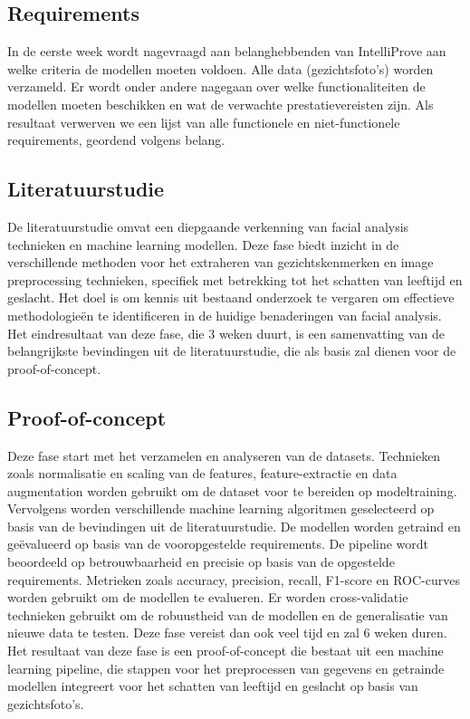 \subsection{Requirements}
\label{sub:requirements}
In de eerste week wordt nagevraagd aan belanghebbenden van IntelliProve aan welke criteria de modellen moeten voldoen. Alle data (gezichtsfoto's) worden verzameld. Er wordt onder andere nagegaan over welke functionaliteiten de modellen moeten beschikken en wat de verwachte prestatievereisten zijn. 
Als resultaat verwerven we een lijst van alle functionele en niet-functionele requirements, geordend volgens belang. 

\subsection{Literatuurstudie}
\label{sub:literatuurstudie}
De literatuurstudie omvat een diepgaande verkenning van facial analysis technieken en machine learning modellen. 
Deze fase biedt inzicht in de verschillende methoden voor het extraheren van gezichtskenmerken en image preprocessing technieken, specifiek met betrekking tot het schatten van leeftijd en geslacht.
Het doel is om kennis uit bestaand onderzoek te vergaren om effectieve methodologieën te identificeren in de huidige benaderingen van facial analysis. 
Het eindresultaat van deze fase, die 3 weken duurt, is een samenvatting van de belangrijkste bevindingen uit de literatuurstudie, die als basis zal dienen voor de proof-of-concept.
\subsection{Proof-of-concept}
\label{sub:proof-of-concept}
Deze fase start met het verzamelen en analyseren van de datasets. Technieken zoals normalisatie en scaling van de features, feature-extractie en data augmentation worden gebruikt om de dataset voor te bereiden op modeltraining.
Vervolgens worden verschillende machine learning algoritmen geselecteerd op basis van de bevindingen uit de literatuurstudie. De modellen worden getraind en geëvalueerd op basis van de vooropgestelde requirements. 
De pipeline wordt beoordeeld op betrouwbaarheid en precisie op basis van de opgestelde requirements. Metrieken zoals accuracy, precision, recall, F1-score en ROC-curves worden gebruikt om de modellen te evalueren.
Er worden cross-validatie technieken gebruikt om de robuustheid van de modellen en de generalisatie van nieuwe data te testen. 
Deze fase vereist dan ook veel tijd en zal 6 weken duren. Het resultaat van deze fase is een proof-of-concept die bestaat uit een machine learning pipeline, die stappen voor het preprocessen van gegevens en getrainde modellen integreert voor het schatten van leeftijd en geslacht op basis van gezichtsfoto's.

